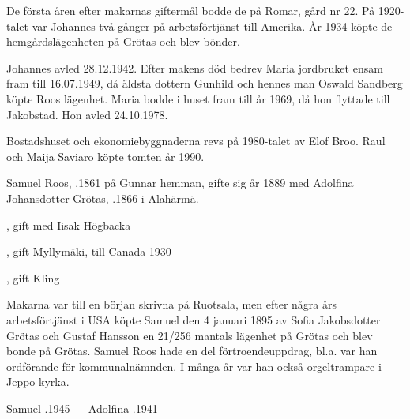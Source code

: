 De första åren efter makarnas giftermål bodde de på Romar, gård nr 22. På 1920-talet var Johannes två gånger på arbetsförtjänst till Amerika. År 1934 köpte de hemgårdslägenheten på Grötas och blev bönder.

Johannes avled 28.12.1942. Efter makens död bedrev Maria jordbruket ensam fram till 16.07.1949, då äldsta dottern Gunhild och hennes man Oswald Sandberg köpte Roos lägenhet. Maria bodde i huset fram till år 1969, då hon flyttade till Jakobstad. Hon avled 24.10.1978.

Bostadshuset och ekonomiebyggnaderna revs på 1980-talet av Elof Broo. Raul och Maija Saviaro köpte tomten år 1990.


Samuel Roos, .1861 på Gunnar hemman, gifte sig år 1889 med Adolfina Johansdotter Grötas, .1866 i Alahärmä.
\begin{jhchildren}
  \item {}, gift med Iisak Högbacka
  \item {}
  \item {}
  \item {}
  \item {}, gift Myllymäki, till Canada 1930
  \item {}, gift Kling
  \item {}
  \item {}
  \item {}
\end{jhchildren}

Makarna var till en början skrivna på Ruotsala, men efter några års	arbetsförtjänst i USA köpte Samuel den 4 januari 1895 av Sofia Jakobsdotter Grötas och Gustaf Hansson en 21/256 mantals lägenhet	på Grötas och blev bonde på Grötas. Samuel Roos hade en del förtroendeuppdrag, bl.a. var han ordförande för kommunalnämnden. I många år var han också orgeltrampare i Jeppo kyrka.

Samuel .1945  ---  Adolfina .1941


